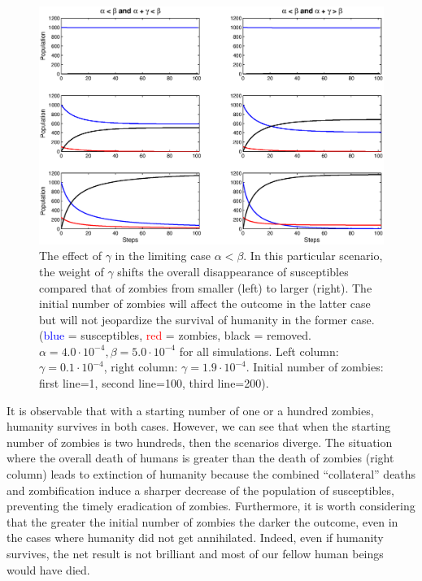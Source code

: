 \documentclass[11pt]{article} %
\begin{document}
\begin{figure}[h!]
\centerline{
\includegraphics[scale=0.55]{../images/Matlab_figures/model-AltB.eps}}
\caption{The effect of $\gamma$ in the limiting case $\alpha<\beta$. In this particular scenario, the weight of $\gamma$ shifts the overall disappearance of susceptibles compared that of zombies from smaller (left) to larger (right). The initial number of zombies will affect the outcome in the latter case but will not jeopardize the survival of humanity in the former case. (\textcolor{blue}{blue} = susceptibles, \textcolor{red}{red} = zombies, black = removed. $\alpha=4.0\cdot10^{-4}, \beta=5.0\cdot10^{-4}$ for all simulations. Left column: $\gamma=0.1\cdot10^{-4}$, right column: $\gamma=1.9\cdot10^{-4}$. Initial number of zombies: first line=1, second line=100, third line=200). \label{gamma_population} }
\end{figure}

It is observable that with a starting number of one or a hundred zombies, humanity survives in both cases. However, we can see that when the starting number of zombies is two hundreds, then the scenarios diverge. The situation where the overall death of humans is greater than the death of zombies (right column) leads to extinction of humanity because the combined ``collateral'' deaths and zombification induce a sharper decrease of the population of susceptibles, preventing the timely eradication of zombies. Furthermore, it is worth considering that the greater the initial number of zombies the darker the outcome, even in the cases where humanity did not get annihilated. Indeed, even if humanity survives, the net result is not brilliant and most of our fellow human beings would have died. 
\end{document}
